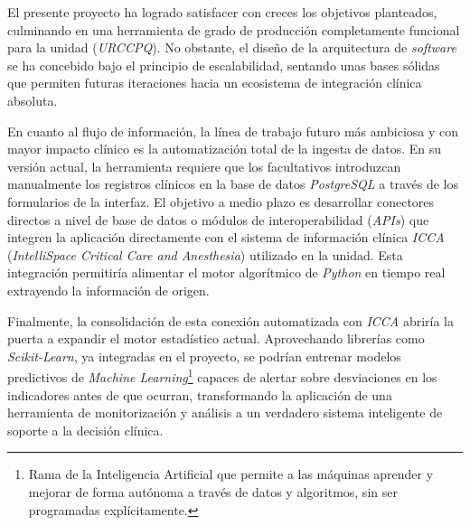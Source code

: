 El presente proyecto ha logrado satisfacer con creces los objetivos planteados, culminando en una herramienta de grado de producción completamente funcional para la unidad (\textit{URCCPQ}). No obstante, el diseño de la arquitectura de \textit{software} se ha concebido bajo el principio de escalabilidad, sentando unas bases sólidas que permiten futuras iteraciones hacia un ecosistema de integración clínica absoluta.

En cuanto al flujo de información, la línea de trabajo futuro más ambiciosa y con mayor impacto clínico es la automatización total de la ingesta de datos. En su versión actual, la herramienta requiere que los facultativos introduzcan manualmente los registros clínicos en la base de datos \textit{PostgreSQL} a través de los formularios de la interfaz. El objetivo a medio plazo es desarrollar conectores directos a nivel de base de datos o módulos de interoperabilidad (\textit{APIs}) que integren la aplicación directamente con el sistema de información clínica \textit{ICCA} (\textit{IntelliSpace Critical Care and Anesthesia}) utilizado en la unidad. Esta integración permitiría alimentar el motor algorítmico de \textit{Python} en tiempo real extrayendo la información de origen.

Finalmente, la consolidación de esta conexión automatizada con \textit{ICCA} abriría la puerta a expandir el motor estadístico actual. Aprovechando librerías como \textit{Scikit-Learn}, ya integradas en el proyecto, se podrían entrenar modelos predictivos de \textit{Machine Learning}\footnote{Rama de la Inteligencia Artificial que permite a las máquinas aprender y mejorar de forma autónoma a través de datos y algoritmos, sin ser programadas explícitamente.} capaces de alertar sobre desviaciones en los indicadores antes de que ocurran, transformando la aplicación de una herramienta de monitorización y análisis a un verdadero sistema inteligente de soporte a la decisión clínica.